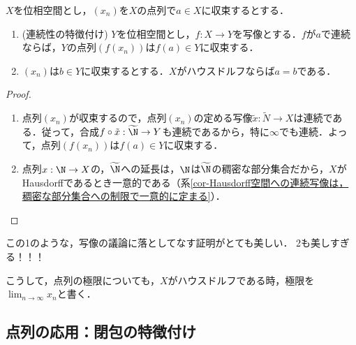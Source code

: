 \documentclass[uplatex,dvipdfmx]{jsreport}
\newcommand{\wN}{\widetilde{\N}}
\begin{document}
\begin{corollary}[連続性の極限の言葉による特徴付け]\label{cor-characterization-of-continuousness-in-terms-of-limits}
    $X$を位相空間とし，$(x_n)$を$X$の点列で$a\in X$に収束するとする．
    \begin{enumerate}
        \item (連続性の特徴付け) $Y$を位相空間とし，$f:X\to Y$を写像とする．$f$が$a$で連続ならば，$Y$の点列$(f(x_n))$は$f(a)\in Y$に収束する．
        \item $(x_n)$は$b\in Y$に収束するとする．$X$がハウスドルフならば$a=b$である．
    \end{enumerate}
\end{corollary}
\begin{proof}\mbox{}
    \begin{enumerate}
        \item 点列$(x_n)$が収束するので，点列$(x_n)$の定める写像$\tilde{x}:\widetilde{N}\to X$は連続である．従って，合成$f\circ\tilde{x}:\wN\to Y$も連続であるから，特に$\infty$でも連続．よって，点列$(f(x_n))$は$f(a)\in Y$に収束する．
        \item 点列$x:\N\to X$の，$\wN$への延長は，$\N$は$\wN$の稠密な部分集合だから，$X$がHausdorffであるとき一意的である（系\ref{cor-Hausdorff空間への連続写像は，稠密な部分集合への制限で一意的に定まる}）．
    \end{enumerate}
\end{proof}
\begin{remarks}
    この1のような，写像の議論に落としてなす証明がとても美しい．
    2も美しすぎる！！！
\end{remarks}

こうして，点列の極限についても，$X$がハウスドルフである時，極限を$\lim_{n\to\infty}x_n$と書く．

\subsection{点列の応用：閉包の特徴付け}
\end{document}

